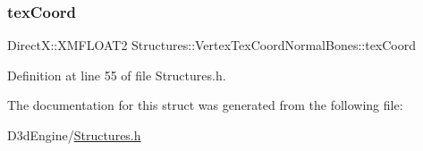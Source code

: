 \subsubsection{\texorpdfstring{tex\+Coord}{texCoord}}
{\footnotesize\ttfamily Direct\+X\+::\+X\+M\+F\+L\+O\+A\+T2 Structures\+::\+Vertex\+Tex\+Coord\+Normal\+Bones\+::tex\+Coord}



Definition at line 55 of file Structures.\+h.



The documentation for this struct was generated from the following file\+:\begin{DoxyCompactItemize}
\item 
D3d\+Engine/\mbox{\hyperlink{_structures_8h}{Structures.\+h}}\end{DoxyCompactItemize}

